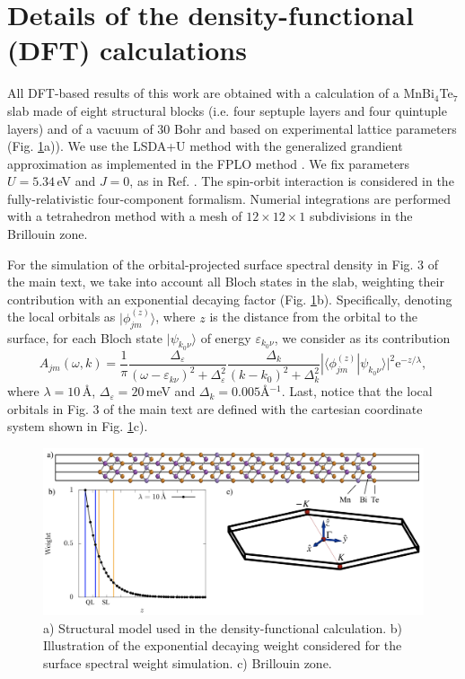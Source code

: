 \documentclass[showpacs, preprintnumbers, pra, superscriptaddress, floatfix, onecolumn, longbibliography]{revtex4-1}
\begin{document}
\title{}


\maketitle

\section{Details of the density-functional (DFT) calculations}

All DFT-based results of this work are obtained with a calculation of a MnBi$_4$Te$_7$ slab made of eight structural blocks (i.e. four septuple layers and four quintuple layers) and of a vacuum of 30 Bohr and based on experimental lattice parameters (Fig. \ref{dft_structure}a)).
We use the LSDA+U method with the generalized grandient approximation as implemented in the FPLO method \cite{}. We fix parameters $U=5.34\,$eV and $J=0$, as in Ref. \cite{}. The spin-orbit interaction is considered in the fully-relativistic four-component formalism. Numerial integrations are performed with a tetrahedron method with a mesh of $12\times12\times1$ subdivisions in the Brillouin zone.

For the simulation of the orbital-projected surface spectral density in Fig. 3 of the main text, we take into account all Bloch states in the slab, weighting their contribution with an exponential decaying factor (Fig. \ref{dft_structure}b). Specifically, denoting the local orbitals as $|\phi^{(z)}_{jm}\rangle$, where $z$ is the distance from the orbital to the surface, for each Bloch state $|\psi_{k_0\nu}\rangle$ of energy $\varepsilon_{k_0\nu}$, we consider as its contribution 
\begin{equation}
A_{jm}(\omega,k)=\frac{1}{\pi}\frac{ \Delta_\varepsilon}{(\omega-\varepsilon_{k\nu})^2 + \Delta^2_\varepsilon}\frac{ \Delta_k}{(k-k_0)^2 + \Delta^2_k }|\langle \phi^{(z)}_{jm} | \psi_{k_0\nu} \rangle|^2 \text{e}^{-z/\lambda},
\end{equation}
where $\lambda=10\,$\AA, $\Delta_\varepsilon=20\,$meV and $\Delta_k=0.005$\AA$^{-1}$. Last, notice that the local orbitals in Fig. 3 of the main text are defined with the cartesian coordinate system shown in Fig. \ref{dft_structure}c).

\begin{figure}[h!]
 \centering
 \includegraphics[width=14 cm]{structural_data.png}
	\caption{a) Structural model used in the density-functional calculation. b) Illustration of the exponential decaying weight considered for the surface spectral weight simulation. c) Brillouin zone.} 
	\label{dft_structure}
\end{figure}
\end{document}
